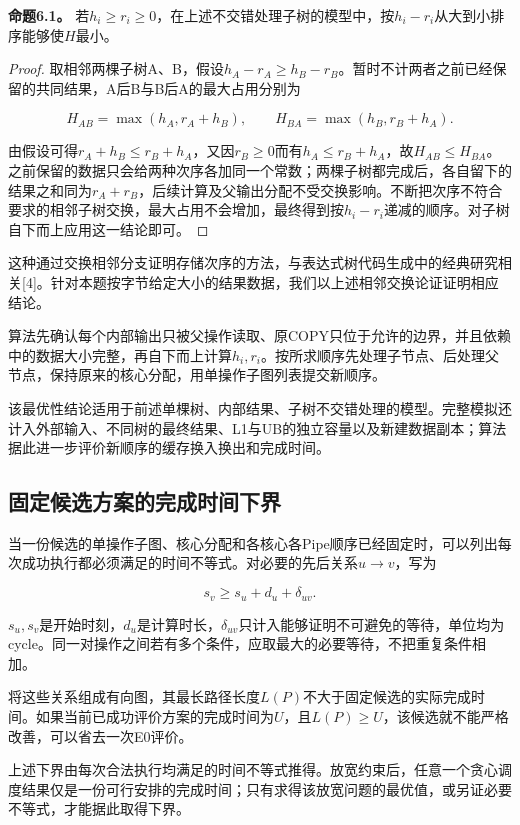\documentclass[anonymous,notoc]{gmcm2026}
\begin{document}
\textbf{命题6.1。} 若\(h_i\ge r_i\ge0\)，在上述不交错处理子树的模型中，按\(h_i-r_i\)从大到小排序能够使\(H\)最小。

\begin{proof} 取相邻两棵子树A、B，假设\(h_A-r_A\ge h_B-r_B\)。暂时不计两者之前已经保留的共同结果，A后B与B后A的最大占用分别为

\[H_{AB}=\max(h_A,r_A+h_B),\qquad H_{BA}=\max(h_B,r_B+h_A).\]

由假设可得\(r_A+h_B\le r_B+h_A\)，又因\(r_B\ge0\)而有\(h_A\le r_B+h_A\)，故\(H_{AB}\le H_{BA}\)。之前保留的数据只会给两种次序各加同一个常数；两棵子树都完成后，各自留下的结果之和同为\(r_A+r_B\)，后续计算及父输出分配不受交换影响。不断把次序不符合要求的相邻子树交换，最大占用不会增加，最终得到按\(h_i-r_i\)递减的顺序。对子树自下而上应用这一结论即可。\end{proof}

这种通过交换相邻分支证明存储次序的方法，与表达式树代码生成中的经典研究相关{[}4{]}。针对本题按字节给定大小的结果数据，我们以上述相邻交换论证证明相应结论。

算法先确认每个内部输出只被父操作读取、原COPY只位于允许的边界，并且依赖中的数据大小完整，再自下而上计算\(h_i,r_i\)。按所求顺序先处理子节点、后处理父节点，保持原来的核心分配，用单操作子图列表提交新顺序。

该最优性结论适用于前述单棵树、内部结果、子树不交错处理的模型。完整模拟还计入外部输入、不同树的最终结果、L1与UB的独立容量以及新建数据副本；算法据此进一步评价新顺序的缓存换入换出和完成时间。

\subsection{固定候选方案的完成时间下界}

当一份候选的单操作子图、核心分配和各核心各Pipe顺序已经固定时，可以列出每次成功执行都必须满足的时间不等式。对必要的先后关系\(u\to v\)，写为

\[s_v\ge s_u+d_u+\delta_{uv}.\]

\(s_u,s_v\)是开始时刻，\(d_u\)是计算时长，\(\delta_{uv}\)只计入能够证明不可避免的等待，单位均为cycle。同一对操作之间若有多个条件，应取最大的必要等待，不把重复条件相加。

将这些关系组成有向图，其最长路径长度\(L(P)\)不大于固定候选的实际完成时间。如果当前已成功评价方案的完成时间为\(U\)，且\(L(P)\ge U\)，该候选就不能严格改善，可以省去一次E0评价。

上述下界由每次合法执行均满足的时间不等式推得。放宽约束后，任意一个贪心调度结果仅是一份可行安排的完成时间；只有求得该放宽问题的最优值，或另证必要不等式，才能据此取得下界。
\end{document}
